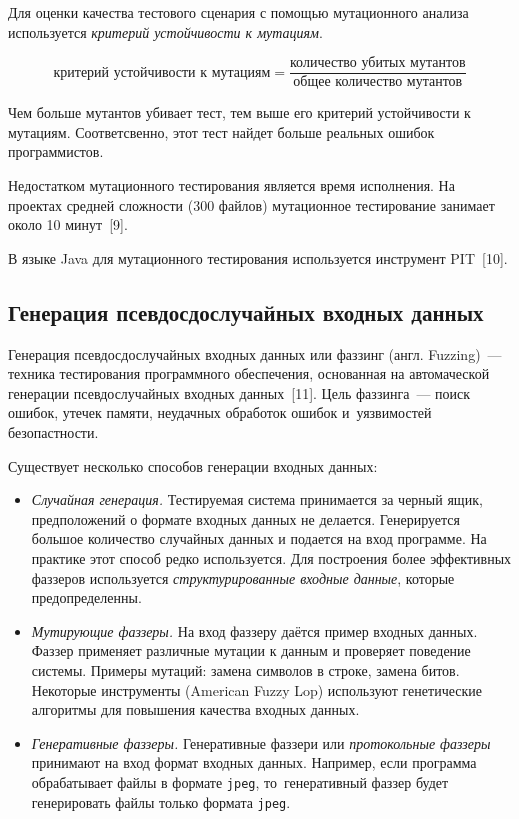 Для оценки качества тестового сценария с помощью мутационного анализа используется \textit{критерий устойчивости к мутациям}.

\[ \text{критерий устойчивости к мутациям} = \frac{\text{количество убитых мутантов}}{\text{общее количество мутантов}}  \]

Чем больше мутантов убивает тест, тем выше его критерий устойчивости к мутациям. Соответсвенно, этот тест найдет больше реальных ошибок программистов. 

Недостатком мутационного тестирования является время исполнения. На проектах средней сложности (300 файлов) мутационное тестирование занимает около 10 минут~[9].

В языке Java для мутационного тестирования используется инструмент PIT~[10].

\subsection{Генерация псевдосдослучайных входных данных} 
 
Генерация псевдосдослучайных входных данных или фаззинг (англ. Fuzzing)~--- техника тестирования программного обеспечения, основанная на автомаческой генерации псевдослучайных входных данных~[11]. Цель фаззинга~--- поиск ошибок, утечек памяти, неудачных обработок ошибок и~уязвимостей безопастности.

Существует несколько способов генерации входных данных:

\begin{itemize}
	\item \textit{Случайная генерация.} Тестируемая система принимается за черный ящик, предположений о формате входных данных не делается. Генерируется большое количество случайных данных и подается на вход программе. На практике этот способ редко используется. Для построения более эффективных фаззеров используется \textit{структурированные входные данные}, которые предопределенны.
	\item \textit{Мутирующие фаззеры.} На вход фаззеру даётся пример входных данных. Фаззер применяет различные мутации к данным и проверяет поведение системы. Примеры мутаций: замена символов в строке, замена битов. Некоторые инструменты (American Fuzzy Lop) используют генетические алгоритмы для повышения качества входных данных.
	\item \textit{Генеративные фаззеры.} Генеративные фаззери или \textit{протокольные фаззеры} принимают на вход формат входных данных. Например, если программа обрабатывает файлы в формате \texttt{jpeg}, то~генеративный фаззер будет генерировать файлы только формата \texttt{jpeg}.
\end{itemize}
 
